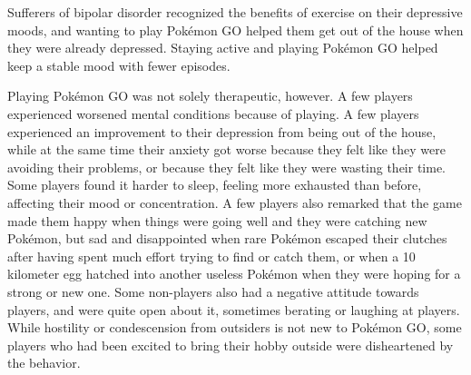Sufferers of bipolar disorder recognized the benefits of exercise on their depressive moods, and wanting to play Pokémon GO helped them get out of the house when they were already depressed. Staying active and playing Pokémon GO helped keep a stable mood with fewer episodes.

Playing Pokémon GO was not solely therapeutic, however. A few players experienced worsened mental conditions because of playing. A few players experienced an improvement to their depression from being out of the house, while at the same time their anxiety got worse because they felt like they were avoiding their problems, or because they felt like they were wasting their time. Some players found it harder to sleep, feeling more exhausted than before, affecting their mood or concentration. A few players also remarked that the game made them happy when things were going well and they were catching new Pokémon, but sad and disappointed when rare Pokémon escaped their clutches after having spent much effort trying to find or catch them, or when a 10 kilometer egg hatched into another useless Pokémon when they were hoping for a strong or new one. Some non-players also had a negative attitude towards players, and were quite open about it, sometimes berating or laughing at players. While hostility or condescension from outsiders is not new to Pokémon GO, some players who had been excited to bring their hobby outside were disheartened by the behavior.
